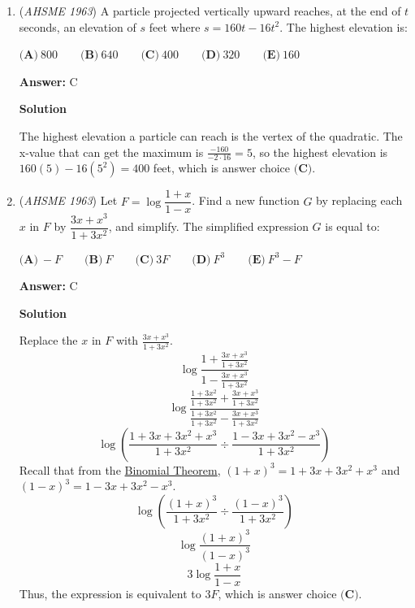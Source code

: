 \begin{enumerate}
 Thus, the $k$ value that maximizes the product of the roots is $\frac{4}{3}$, which is answer choice $\boxed{\textbf{(D)}}$.

 


 


	\item (\textit{AHSME 1963}) A particle projected vertically upward reaches, at the end of $t$ seconds, an elevation of $s$ feet where $s = 160 t - 16t^2$. The highest elevation is:


 $\textbf{(A)}\ 800 \qquad \textbf{(B)}\ 640\qquad \textbf{(C)}\ 400 \qquad \textbf{(D)}\ 320 \qquad \textbf{(E)}\ 160$

 \textbf{Answer: }C



\textbf{Solution}

The highest elevation a particle can reach is the vertex of the quadratic.  The x-value that can get the maximum is $\frac{-160}{-2 \cdot 16} = 5$, so the highest elevation is $160(5) - 16(5^2) = 400$ feet, which is answer choice $\boxed{\textbf{(C)}}$.

 


	\item (\textit{AHSME 1963}) Let $F=\log\dfrac{1+x}{1-x}$. Find a new function $G$ by replacing each $x$ in $F$ by $\dfrac{3x+x^3}{1+3x^2}$, and simplify. 
The simplified expression $G$ is equal to:


 $\textbf{(A)}\ -F \qquad \textbf{(B)}\ F\qquad \textbf{(C)}\ 3F \qquad \textbf{(D)}\ F^3 \qquad \textbf{(E)}\ F^3-F$

 \textbf{Answer: }C



\textbf{Solution}

Replace the $x$ in $F$ with $\frac{3x+x^3}{1+3x^2}$.
 \[\log\dfrac{1 + \frac{3x+x^3}{1+3x^2} }{1 - \frac{3x+x^3}{1+3x^2} }\]
 \[\log\dfrac{\frac{1+3x^2}{1+3x^2} + \frac{3x+x^3}{1+3x^2} }{\frac{1+3x^2}{1+3x^2} - \frac{3x+x^3}{1+3x^2} }\]
 \[\log (\frac{1+3x+3x^2+x^3}{1+3x^2} \div \frac{1-3x+3x^2-x^3}{1+3x^2})\]Recall that from the \href{https://artofproblemsolving.com/wiki/index.php?title=Binomial\_Theorem}{Binomial Theorem}, $(1+x)^3 = 1+3x+3x^2+x^3$ and $(1-x)^3 = 1-3x+3x^2-x^3$.
 \[\log (\frac{(1+x)^3}{1+3x^2} \div \frac{(1-x)^3}{1+3x^2})\]
 \[\log\dfrac{(1+x)^3}{(1-x)^3}\]
 \[3 \log\dfrac{1+x}{1-x}\]Thus, the expression is equivalent to $3F$, which is answer choice $\boxed{\textbf{(C)}}$.

 



\end{enumerate}
